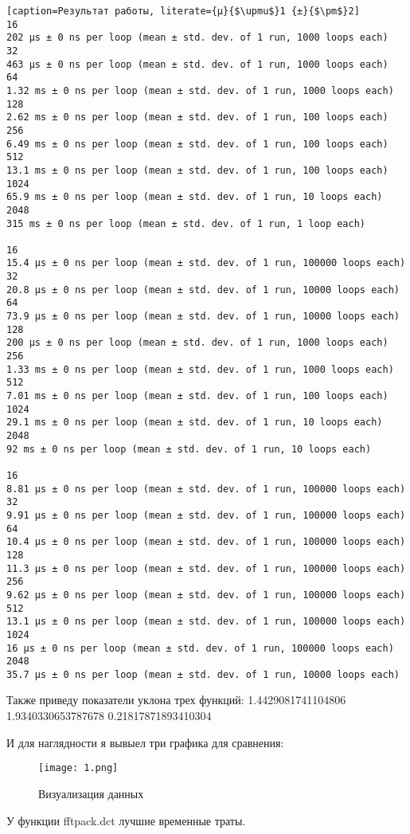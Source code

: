 \documentclass[a4paper,12pt]{report}
\begin{document}
\begin{lstlisting}[caption=Результат работы, literate={µ}{$\upmu$}1 {±}{$\pm$}2]
16
202 µs ± 0 ns per loop (mean ± std. dev. of 1 run, 1000 loops each)
32
463 µs ± 0 ns per loop (mean ± std. dev. of 1 run, 1000 loops each)
64
1.32 ms ± 0 ns per loop (mean ± std. dev. of 1 run, 1000 loops each)
128
2.62 ms ± 0 ns per loop (mean ± std. dev. of 1 run, 100 loops each)
256
6.49 ms ± 0 ns per loop (mean ± std. dev. of 1 run, 100 loops each)
512
13.1 ms ± 0 ns per loop (mean ± std. dev. of 1 run, 100 loops each)
1024
65.9 ms ± 0 ns per loop (mean ± std. dev. of 1 run, 10 loops each)
2048
315 ms ± 0 ns per loop (mean ± std. dev. of 1 run, 1 loop each)

16
15.4 µs ± 0 ns per loop (mean ± std. dev. of 1 run, 100000 loops each)
32
20.8 µs ± 0 ns per loop (mean ± std. dev. of 1 run, 10000 loops each)
64
73.9 µs ± 0 ns per loop (mean ± std. dev. of 1 run, 10000 loops each)
128
200 µs ± 0 ns per loop (mean ± std. dev. of 1 run, 1000 loops each)
256
1.33 ms ± 0 ns per loop (mean ± std. dev. of 1 run, 1000 loops each)
512
7.01 ms ± 0 ns per loop (mean ± std. dev. of 1 run, 100 loops each)
1024
29.1 ms ± 0 ns per loop (mean ± std. dev. of 1 run, 10 loops each)
2048
92 ms ± 0 ns per loop (mean ± std. dev. of 1 run, 10 loops each)

16
8.81 µs ± 0 ns per loop (mean ± std. dev. of 1 run, 100000 loops each)
32
9.91 µs ± 0 ns per loop (mean ± std. dev. of 1 run, 100000 loops each)
64
10.4 µs ± 0 ns per loop (mean ± std. dev. of 1 run, 100000 loops each)
128
11.3 µs ± 0 ns per loop (mean ± std. dev. of 1 run, 100000 loops each)
256
9.62 µs ± 0 ns per loop (mean ± std. dev. of 1 run, 100000 loops each)
512
13.1 µs ± 0 ns per loop (mean ± std. dev. of 1 run, 100000 loops each)
1024
16 µs ± 0 ns per loop (mean ± std. dev. of 1 run, 100000 loops each)
2048
35.7 µs ± 0 ns per loop (mean ± std. dev. of 1 run, 10000 loops each)
\end{lstlisting}

Также приведу показатели уклона трех функций:
1.4429081741104806
1.9340330653787678
0.21817871893410304

И для наглядности я вывыел три графика для сравнения:

\begin{figure}[H]
        \centering
        \texttt{[image: 1.png]}
        \caption{Визуализация данных}
        \label{fig:lab6_fig1_1}
\end{figure}

У функции fftpack.dct лучшие временные траты. 
\end{document}
